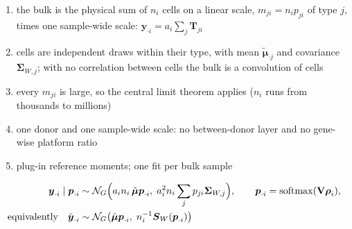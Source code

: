 \documentclass[pdflatex, sn-nature]{sn-jnl}
\theoremstyle{thmstyleone}%
\theoremstyle{thmstyletwo}%
\theoremstyle{thmstylethree}%
\begin{document}
\begin{enumerate}[label=(B\arabic*)]
  \item the bulk is the physical sum of \(n_{i}\) cells on a linear scale, \(m_{ji}=n_{i}p_{ji}\) of type \(j\), times one
        sample-wide scale: \(\boldsymbol{y}_{\cdot i}=a_{i}\sum_{j}\boldsymbol{T}_{ji}\)
  \item cells are independent draws within their type, with mean \(\tilde{\boldsymbol{\mu}}_{\cdot j}\) and covariance
        \(\boldsymbol{\Sigma}_{W,j}\); with no correlation between cells the bulk is a convolution of cells
  \item every \(m_{ji}\) is large, so the central limit theorem applies (\(n_{i}\) runs from thousands to millions)
  \item one donor and one sample-wide scale: no between-donor layer and no gene-wise platform ratio
  \item plug-in reference moments; one fit per bulk sample
\end{enumerate}

\begin{equation}
  \begin{aligned}
    \boldsymbol{y}_{\cdot i}\mid\boldsymbol{p}_{\cdot i}
    &\sim\mathcal{N}_{G}\Bigl(
      a_{i}n_{i}\,\tilde{\boldsymbol{\mu}}\boldsymbol{p}_{\cdot i},\;
      a_{i}^{2}n_{i}\sum_{j}p_{ji}\boldsymbol{\Sigma}_{W,j}
    \Bigr),
    \qquad
    \boldsymbol{p}_{\cdot i}=\operatorname{softmax}(\mathbf{V}\boldsymbol{\rho}_{i}),\\
    \text{equivalently}\quad
    \tilde{\boldsymbol{y}}_{\cdot i}
    &\sim\mathcal{N}_{G}\bigl(\tilde{\boldsymbol{\mu}}\boldsymbol{p}_{\cdot i},\;n_{i}^{-1}\boldsymbol{S}_{W}(\boldsymbol{p}_{\cdot i})\bigr)
  \end{aligned}
  \label{eq:sc-model}
\end{equation}
\end{document}
